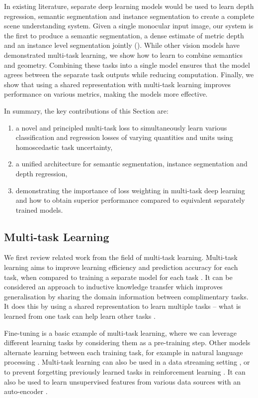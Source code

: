 In existing literature, separate deep learning models would be used to learn depth regression, semantic segmentation and instance segmentation to create a complete scene understanding system. Given a single monocular input image, our system is the first to produce a semantic segmentation, a dense estimate of metric depth and an instance level segmentation jointly (). While other vision models have demonstrated multi-task learning, we show how to learn to combine semantics and geometry. Combining these tasks into a single model ensures that the model agrees between the separate task outputs while reducing computation. Finally, we show that using a shared representation with multi-task learning improves performance on various metrics, making the models more effective.

In summary, the key contributions of this Section are:
\begin{enumerate}
\item a novel and principled multi-task loss to simultaneously learn various classification and regression losses of varying quantities and units using homoscedastic task uncertainty,
\item a unified architecture for semantic segmentation, instance segmentation and depth regression,
\item demonstrating the importance of loss weighting in multi-task deep learning and how to obtain superior performance compared to equivalent separately trained models.
\end{enumerate}



\subsection{Multi-task Learning}

We first review related work from the field of multi-task learning. Multi-task learning aims to improve learning efficiency and prediction accuracy for each task, when compared to training a separate model for each task \cite{thrun1996learning,baxter2000model}. It can be considered an approach to inductive knowledge transfer which improves generalisation by sharing the domain information between complimentary tasks. It does this by using a shared representation to learn multiple tasks -- what is learned from one task can help learn other tasks \cite{caruana1998multitask}.

Fine-tuning \cite{agrawal2015learning,oquab2014learning} is a basic example of multi-task learning, where we can leverage different learning tasks by considering them as a pre-training step.
Other models alternate learning between each training task, for example in natural language processing \cite{collobert2008unified}.
Multi-task learning can also be used in a data streaming setting \cite{thrun1996learning}, or to prevent forgetting previously learned tasks in reinforcement learning \cite{kirkpatrick2017overcoming}. It can also be used to learn unsupervised features from various data sources with an auto-encoder \cite{ngiam2011multimodal}.


